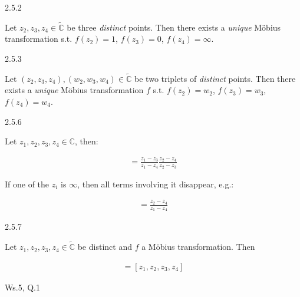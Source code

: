 \documentclass[10pt,landscape]{article}
\begin{document}
\begin{multicols}{3}
\begin{theorem}{2.5.2}{}

    Let $z_2, z_3, z_4 \in \tilde{\mathbb{C}}$ be three \emph{distinct} points. Then there exists a \emph{unique} Möbius transformation s.t. $f(z_2)=1$, $f(z_3)=0$, $f(z_4)=\infty$.

\end{theorem}

\begin{corollary}{2.5.3}{}

    Let $(z_2,z_3,z_4),(w_2,w_3,w_4) \in \tilde{\mathbb{C}}$ be two triplets of \emph{distinct} points. Then there exists a \emph{unique} Möbius transformation $f$ s.t. $f(z_2)=w_2$, $f(z_3)=w_3$, $f(z_4)=w_4$.

\end{corollary}

\begin{remark}{2.5.6}{}

    Let $z_1,z_2,z_3,z_4 \in \mathbb{C}$, then:

        \begin{align*}
            [z_1,z_2,z_3,z_4] = \frac{z_1 - z_3}{z_1 - z_4} \frac{z_2 - z_4}{z_2 - z_3}
        \end{align*}

    If one of the $z_i$ is $\infty$, then all terms involving it disappear, e.g.:

        \begin{align*}
            [z_1,z_2,\infty,z_4] = \frac{z_2 - z_4}{z_1 - z_4}
        \end{align*}

\end{remark}

\begin{theorem}{2.5.7}{}

    Let $z_1,z_2, z_3, z_4 \in \tilde{\mathbb{C}}$ be distinct and $f$ a Möbius transformation. Then

        \begin{align*}
            [f(z_1),f(z_2),f(z_3),f(z_4)] = [z_1,z_2,z_3,z_4]
        \end{align*}

\end{theorem}

\begin{question}{Ws.5, Q.1}{}


\end{question}
\end{multicols}
\end{document}
